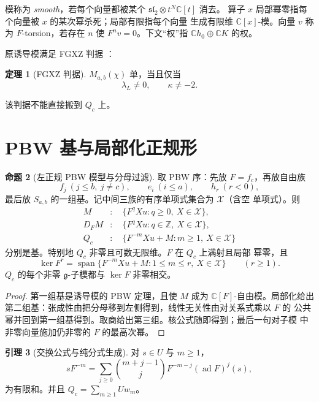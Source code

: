 \documentclass[UTF8,11pt]{ctexart}
\newcommand{\C}{\mathbb C}
\newcommand{\Z}{\mathbb Z}
\newcommand{\g}{\mathfrak g}
\newcommand{\slc}{\mathfrak{sl}_2}
\newcommand{\ad}{\operatorname{ad}}
\newcommand{\Span}{\operatorname{span}}
\newcommand{\X}{\mathcal X}
\theoremstyle{definition}
\newtheorem{proposition}{命题}[section]
\newtheorem{lemma}[proposition]{引理}
\newtheorem{theorem}[proposition]{定理}
\begin{document}
模称为 \emph{smooth}，若每个向量都被某个 \(\slc\otimes t^N\C[t]\) 消去。
算子 \(x\) 局部幂零指每个向量被 \(x\) 的某次幂杀死；局部有限指每个向量
生成有限维 \(\C[x]\)-模。向量 \(v\) 称为 \(F\)-torsion，若存在 \(n\) 使
\(F^nv=0\)。下文“权”指 \(\C h_0\oplus\C K\) 的权。

原诱导模满足 FGXZ 判据 \cite{FGXZ}：

\begin{theorem}[FGXZ 判据]\label{thm:fgxz}
\(M_{a,b}(\chi)\) 单，当且仅当
\[
\lambda_L\ne0,\qquad \kappa\ne-2.
\]
\end{theorem}

该判据不能直接搬到 \(Q_c\) 上。

\section{PBW 基与局部化正规形}\label{sec:pbw}

\begin{proposition}[左正规 PBW 模型与分母过滤]\label{prop:pbw}
取 PBW 序：先放 \(F=f_c\)，再放自由族
\[
f_j\ (j\le b,\ j\ne c),\qquad e_i\ (i\le a),\qquad h_r\ (r<0),
\]
最后放 \(S_{a,b}\) 的一组基。记中间三族的有序单项式集合为 \(\X\)（含空
单项式）。则
\begin{align*}
M &: \quad \{F^qXu:q\ge0,\ X\in\X\},\\
D_FM &: \quad \{F^qXu:q\in\Z,\ X\in\X\},\\
Q_c &: \quad \{F^{-m}Xu+M:m\ge1,\ X\in\X\}
\end{align*}
分别是基。特别地 \(Q_c\) 非零且可数无限维。\(F\) 在 \(Q_c\) 上满射且局部
幂零，且
\[
\ker F^r=\Span\{F^{-m}Xu+M:1\le m\le r,\ X\in\X\}\qquad(r\ge1).
\]
\(Q_c\) 的每个非零 \(\g\)-子模都与 \(\ker F\) 非零相交。
\end{proposition}

\begin{proof}
第一组基是诱导模的 PBW 定理，且使 \(M\) 成为 \(\C[F]\)-自由模。局部化给出
第二组基：张成性由把分母移到左侧得到，线性无关性由对关系式乘以 \(F\) 的
公共幂并回到第一组基得到。取商给出第三组。核公式随即得到；最后一句对子模
中非零向量施加仍非零的 \(F\) 的最高次幂。
\end{proof}

\begin{lemma}[交换公式与纯分式生成]\label{lem:fractions}
对 \(s\in U\) 与 \(m\ge1\)，
\begin{equation}\label{eq:commute}
sF^{-m}=\sum_{j\ge0}\binom{m+j-1}{j}F^{-m-j}(\ad F)^j(s),
\end{equation}
为有限和。并且 \(Q_c=\sum_{m\ge1}Uw_m\)。
\end{lemma}
\end{document}
